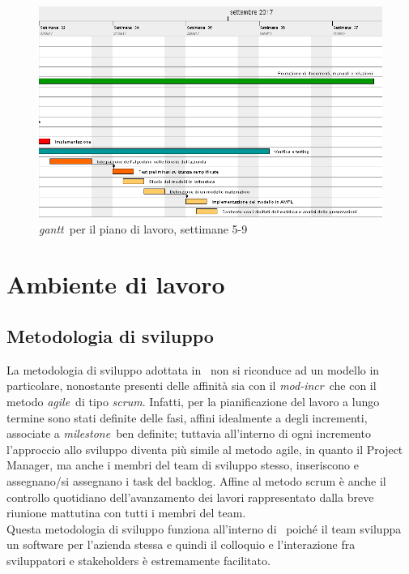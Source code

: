 \begin{figure}[!h]
    \begin{widepage}
    \includegraphics[width=14.9cm,keepaspectratio]{../immagini/pdp_2.png}
    \caption{\emph{\gls{gantt}}\glsfirstoccur\ per il piano di lavoro, settimane 5-9}
    \end{widepage}
\end{figure}

\clearpage
\section{Ambiente di lavoro}
    \subsection{Metodologia di sviluppo}
    La metodologia di sviluppo adottata in \TS\ non si riconduce ad un modello in particolare, nonostante presenti delle affinità sia con il \emph{\gls{mod-incr}}\glsfirstoccur\ che con il metodo \emph{\gls{agile}}\glsfirstoccur\ di tipo \emph{\gls{scrum}}\glsfirstoccur. Infatti, per la pianificazione del lavoro a lungo termine sono stati definite delle fasi, affini idealmente a degli incrementi, associate a \emph{\gls{milestone}}\glsfirstoccur\ ben definite; tuttavia all'interno di ogni incremento l'approccio allo sviluppo diventa più simile al metodo agile, in quanto il Project Manager, ma anche i membri del team di sviluppo stesso,  inseriscono e assegnano/si assegnano i task del backlog. Affine al metodo scrum è anche il controllo quotidiano dell'avanzamento dei lavori rappresentato dalla breve riunione mattutina con tutti i membri del team. \\
    Questa metodologia di sviluppo funziona all'interno di \TS\ poiché il team sviluppa un software per l'azienda stessa e quindi il colloquio e l'interazione fra sviluppatori e stakeholders è estremamente facilitato.

